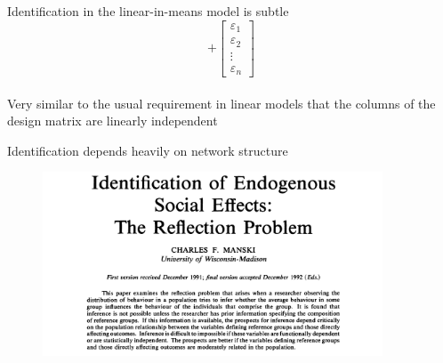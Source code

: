 \documentclass[aspectratio=169]{beamer}
\theoremstyle{remark}
\begin{document}
\begin{frame}{Identification in the linear-in-means model is subtle}
\begin{equation*}
        +
        \begin{bmatrix}
            \varepsilon_1 \\
            \varepsilon_2 \\
            \vdots        \\
            \varepsilon_n
        \end{bmatrix}
    \end{equation*} \\
    \vspace{4mm}
    Very similar to the usual requirement in linear models that the columns of the design matrix are linearly independent
\end{frame}

\begin{frame}{Identification depends heavily on network structure}
    \vspace{5mm}
    \begin{figure}
        \centering
        \includegraphics[width=0.9\textwidth]{./manski1993.png}
    \end{figure}
\end{frame}
\end{document}
